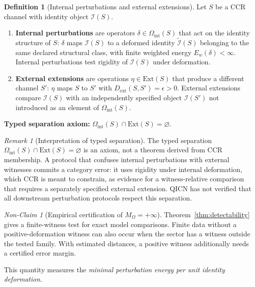 \documentclass[11pt,a4paper]{article}
\theoremstyle{plain}
\theoremstyle{definition}
\newtheorem{definition}[theorem]{Definition}
\theoremstyle{remark}
\newtheorem{remark}[theorem]{Remark}
\newtheorem{nonclaim}[theorem]{Non-Claim}
\begin{document}
\begin{definition}[Internal perturbations and external extensions]\label{def:internal-external}
Let $S$ be a CCR channel with identity object $\mathcal{I}(S)$.
\begin{enumerate}[leftmargin=*]
\item \textbf{Internal perturbations} are operators $\delta\in\Omega_{\mathrm{int}}(S)$ that act on the identity structure of $S$: $\delta$ maps $\mathcal{I}(S)$ to a deformed identity $\widetilde{\mathcal{I}}(S)$ belonging to the same declared structural class, with finite weighted energy $E_w(\delta)<\infty$. Internal perturbations test rigidity of $\mathcal{I}(S)$ under deformation.
\item \textbf{External extensions} are operations $\eta\in\mathrm{Ext}(S)$ that produce a different channel $S'$: $\eta$ maps $S$ to $S'$ with $D_{\mathrm{ext}}(S,S')=\epsilon>0$. External extensions compare $\mathcal{I}(S)$ with an independently specified object $\mathcal{I}(S')$ not introduced as an element of $\Omega_{\mathrm{int}}(S)$.
\end{enumerate}
\textbf{Typed separation axiom:} $\Omega_{\mathrm{int}}(S)\cap\mathrm{Ext}(S)=\varnothing$.
\end{definition}

\begin{remark}[Interpretation of typed separation]\label{rem:typed-separation}
The typed separation $\Omega_{\mathrm{int}}(S)\cap\mathrm{Ext}(S)=\varnothing$ is an axiom, not a theorem derived from CCR membership. A protocol that confuses internal perturbations with external witnesses commits a category error: it uses rigidity under internal deformation, which CCR is meant to constrain, as evidence for a witness-relative comparison that requires a separately specified external extension. QICN has not verified that all downstream perturbation protocols respect this separation.
\end{remark}

\begin{nonclaim}[Empirical certification of $M_\Omega=+\infty$]\label{nonclaim:m-omega-empirical}
Theorem~\ref{thm:detectability} gives a finite-witness test for exact model comparisons. Finite data without a positive-deformation witness can also occur when the sector has a witness outside the tested family. With estimated distances, a positive witness additionally needs a certified error margin.
\end{nonclaim}

This quantity measures the \textit{minimal perturbation energy per unit identity deformation}.
\end{document}
